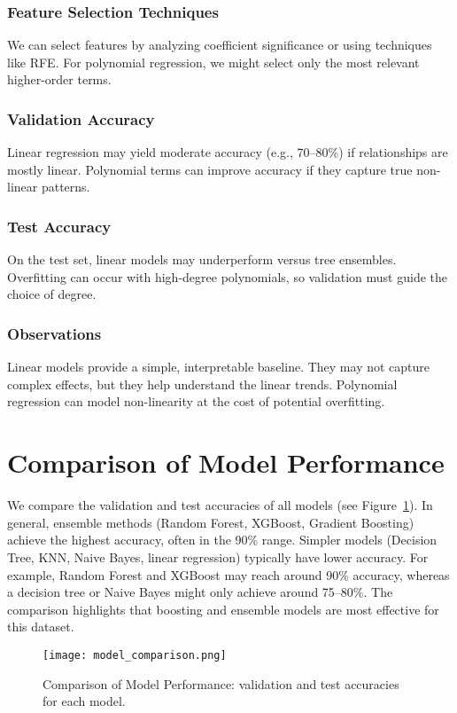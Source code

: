 \documentclass[12pt]{article}
\begin{document}
\subsubsection{Feature Selection Techniques}
We can select features by analyzing coefficient significance or using techniques like RFE. For polynomial regression, we might select only the most relevant higher-order terms.
\subsubsection{Validation Accuracy}
Linear regression may yield moderate accuracy (e.g., 70--80\%) if relationships are mostly linear. Polynomial terms can improve accuracy if they capture true non-linear patterns.
\subsubsection{Test Accuracy}
On the test set, linear models may underperform versus tree ensembles. Overfitting can occur with high-degree polynomials, so validation must guide the choice of degree.
\subsubsection{Observations}
Linear models provide a simple, interpretable baseline. They may not capture complex effects, but they help understand the linear trends. Polynomial regression can model non-linearity at the cost of potential overfitting.

\section{Comparison of Model Performance}
We compare the validation and test accuracies of all models (see Figure~\ref{fig:performance}). In general, ensemble methods (Random Forest, XGBoost, Gradient Boosting) achieve the highest accuracy, often in the 90\% range. Simpler models (Decision Tree, KNN, Naive Bayes, linear regression) typically have lower accuracy. For example, Random Forest and XGBoost may reach around 90\% accuracy, whereas a decision tree or Naive Bayes might only achieve around 75--80\%. The comparison highlights that boosting and ensemble models are most effective for this dataset.

\begin{figure}[H]
    \centering
    \texttt{[image: model\_comparison.png]}
    \caption{Comparison of Model Performance: validation and test accuracies for each model.}
    \label{fig:performance}
\end{figure}
\end{document}
